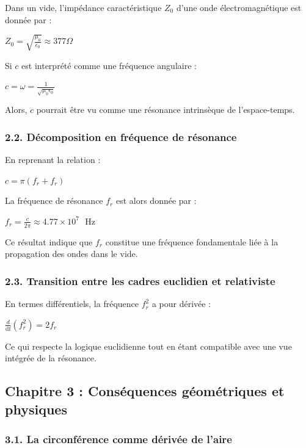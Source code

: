 \documentclass{article}
\newcommand{\tmop}[1]{\ensuremath{\operatorname{#1}}}
\begin{document}
Dans un vide, l'imp{\'e}dance caract{\'e}ristique $Z_0$ d'une onde
{\'e}lectromagn{\'e}tique est donn{\'e}e par :

$Z_0 = \sqrt{\frac{\mu_0}{\epsilon_0}} \approx 377 \Omega$

Si $c$ est interpr{\'e}t{\'e} comme une fr{\'e}quence angulaire :

$c = \omega = \frac{1}{\sqrt{\mu_0 \epsilon_0}}$

Alors, $c$ pourrait {\^e}tre vu comme une r{\'e}sonance intrins{\`e}que de
l'espace-temps.

\subsubsection*{2.2. D{\'e}composition en fr{\'e}quence de r{\'e}sonance}

En reprenant la relation :

$c = \pi (f_r + f_r)$

La fr{\'e}quence de r{\'e}sonance $f_r$ est alors donn{\'e}e par :

$f_r = \frac{c}{2 \pi} \approx 4.77 \times 10^7 \text{ } \text{Hz}$

Ce r{\'e}sultat indique que $f_r$ constitue une fr{\'e}quence fondamentale
li{\'e}e {\`a} la propagation des ondes dans le vide.

\subsubsection*{2.3. Transition entre les cadres euclidien et relativiste}

En termes diff{\'e}rentiels, la fr{\'e}quence $f_r^2$ a pour d{\'e}riv{\'e}e :

$\frac{d}{\tmop{df}} (f_r^2) = 2 f_r$

Ce qui respecte la logique euclidienne tout en {\'e}tant compatible avec une
vue int{\'e}gr{\'e}e de la r{\'e}sonance.

\hrulefill

\subsection*{Chapitre 3 : Cons{\'e}quences g{\'e}om{\'e}triques et physiques}

\subsubsection*{3.1. La circonf{\'e}rence comme d{\'e}riv{\'e}e de l'aire}
\end{document}
